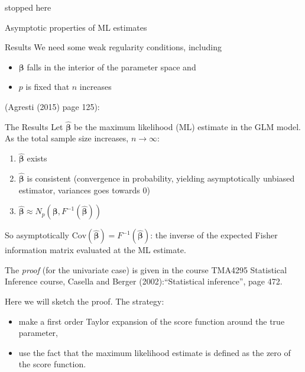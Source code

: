 \documentclass[
  ignorenonframetext,
]{beamer}
\providecommand{\tightlist}{%
  \setlength{\itemsep}{0pt}\setlength{\parskip}{0pt}}
\begin{document}
\begin{frame}
stopped here
\end{frame}

\begin{frame}{Asymptotic properties of ML estimates}
\label{asymptotic-properties-of-ml-estimates}
\begin{block}{Results}
\label{results}
We need some weak regularity conditions, including

\begin{itemize}
\tightlist
\item
  \(\boldsymbol{\beta}\) falls in the interior of the parameter space
  and
\item
  \(p\) is fixed that \(n\) increases
\end{itemize}

(Agresti (2015) page 125):
\end{block}
\end{frame}

\begin{frame}
\begin{block}{The Results}
\label{the-results}
Let \(\hat{\boldsymbol{\beta}}\) be the maximum likelihood (ML) estimate
in the GLM model. As the total sample size increases,
\(n\rightarrow \infty\):

\begin{enumerate}
\tightlist
\item
  \(\hat{\boldsymbol{\beta}}\) exists
\item
  \(\hat{\boldsymbol{\beta}}\) is consistent (convergence in
  probability, yielding asymptotically unbiased estimator, variances
  goes towards 0)
\item
  \(\hat{\boldsymbol{\beta}} \approx N_p(\boldsymbol{\beta},F^{-1}(\hat{\boldsymbol{\beta}}))\)
\end{enumerate}

So asymptotically
\(\text{Cov}(\hat{\boldsymbol{\beta}})=F^{-1}(\hat{\boldsymbol{\beta}})\):
the inverse of the expected Fisher information matrix evaluated at the
ML estimate.
\end{block}
\end{frame}

\begin{frame}
The \emph{proof} (for the univariate case) is given in the course
TMA4295 Statistical Inference course, Casella and Berger
(2002):``Statistical inference'', page 472.

Here we will sketch the proof. The strategy:

\begin{itemize}
\tightlist
\item
  make a first order Taylor expansion of the score function around the
  true parameter,
\item
  use the fact that the maximum likelihood estimate is defined as the
  zero of the score function.
\end{itemize}
\end{frame}
\end{document}
